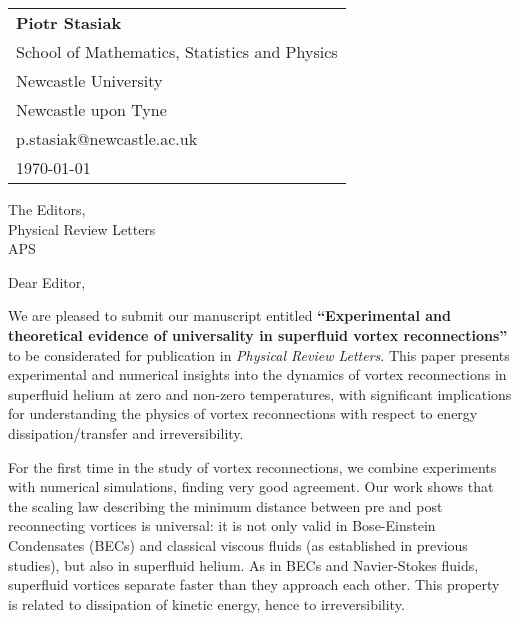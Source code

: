 \documentclass[a4paper,10pt]{letter}
\begin{document}
\begin{flushright}
    \begin{tabular}{l}
        \textbf{Piotr Stasiak} \\
        School of Mathematics, Statistics and Physics\\
        Newcastle University \\
        Newcastle  upon Tyne \\
        p.stasiak@newcastle.ac.uk \\
        \today
    \end{tabular}
\end{flushright}

\vspace{1cm}

The Editors,\\
Physical Review Letters\\
APS\\


\vspace{1cm}

Dear Editor,

\vspace{0.5cm}

We are pleased to submit our manuscript entitled 
\textbf{``Experimental and theoretical evidence of universality 
in superfluid vortex reconnections''} to be
considerated for publication in \textit{Physical Review Letters}. 
This paper presents experimental and numerical insights into the 
dynamics of vortex reconnections in superfluid helium at zero and 
non-zero temperatures, with significant implications 
for understanding the physics of vortex reconnections
with respect to energy dissipation/transfer and irreversibility.

For the first time in the study of vortex reconnections, 
we combine experiments with numerical simulations, finding very good agreement. 
Our work shows that the scaling law describing the minimum distance 
between pre and post reconnecting vortices
is universal: it is not only valid in Bose-Einstein Condensates (BECs) and 
classical viscous fluids (as established in previous studies), but also in superfluid 
helium. As in BECs and Navier-Stokes fluids, superfluid vortices separate faster than they
approach each other.
This property is related to dissipation of kinetic energy, hence to irreversibility. 
\end{document}
